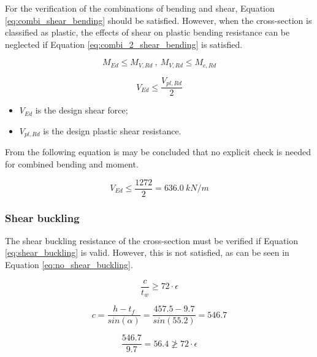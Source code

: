 For the verification of the combinations of bending and shear, Equation \ref{eq:combi_shear_bending} should be satisfied. However, when the cross-section is classified as plastic, the effects of shear on plastic bending resistance can be neglected if Equation \ref{eq:combi_2_shear_bending} is satisfied. 

\begin{equation}
    M_{Ed} \leq M_{V,Rd} \ , \ M_{V,Rd} \leq M_{c,Rd}
    \label{eq:combi_shear_bending}
\end{equation}

\begin{equation}
    V_{Ed} \leq \frac{V_{pl,Rd}}{2}
    \label{eq:combi_2_shear_bending}
\end{equation}

\begin{itemize}
  \item $V_{Ed}$ is the design shear force;
  \item $V_{pl,Rd}$ is the design plastic shear resistance.
\end{itemize}

From the following equation is may be concluded that no explicit check is needed for combined bending and moment. 

\begin{equation}
    V_{Ed} \leq \frac{1272}{2} = 636.0 \ kN/m 
\end{equation}

\subsubsection{Shear buckling}

The shear buckling resistance of the cross-section must be verified if Equation \ref{eq:shear_buckling} is valid. However, this is not satisfied, as can be seen in Equation \ref{eq:no_shear_buckling}.

\begin{equation}
    \frac{c}{t_{w}} \geq 72 \cdot \epsilon
    \label{eq:shear_buckling}
\end{equation}

\begin{equation}
    c = \frac{h - t_{f}}{sin(\alpha)} = \frac{457.5 - 9.7}{sin(55.2)} = 546.7 
\end{equation}

\begin{equation}
    \frac{546.7}{9.7} = 56.4 \ngeq 72 \cdot \epsilon 
    \label{eq:no_shear_buckling}
\end{equation}

